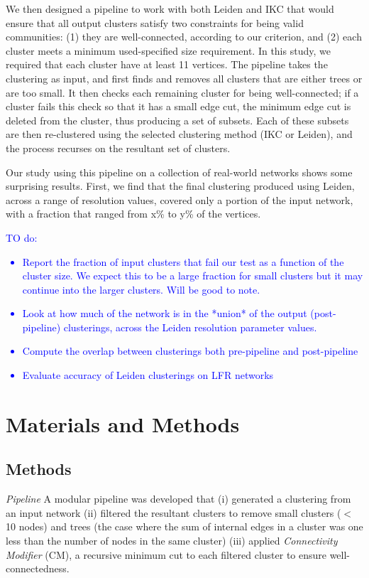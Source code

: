 \documentclass[12pt, oneside]{article}   	%
\begin{document}
We then designed a pipeline to work with both Leiden and IKC that would ensure that all output clusters satisfy two constraints for being valid communities: (1) they are well-connected, according to our criterion, and (2) each cluster meets a minimum used-specified size requirement. In this study, we required that each cluster have at least 11 vertices. The pipeline takes the clustering as input, and first finds and removes all clusters that are either trees or are too small.  It then checks each remaining cluster for being well-connected; if a cluster fails this check so that it has a small edge cut, the minimum edge cut is deleted from the cluster, thus producing a set of subsets.  Each of these subsets are then re-clustered using the selected clustering
method (IKC or Leiden), and the process recurses on the resultant set of clusters.

Our study using this pipeline on a collection of real-world networks shows some surprising results.
First, we find that the final clustering produced using Leiden, across a range of resolution values, 
covered only a portion of the input network, with a  fraction that ranged from x\% to y\% of the vertices.

\textcolor{blue}{TO do:
\begin{itemize}
\item Report the fraction of input clusters that fail our test as a function of the cluster size.
We expect this to be a large fraction for small clusters but it may continue into the larger clusters.
Will be good to note.
\item Look at how much of the network is in the *union* of the output (post-pipeline) clusterings, across the Leiden resolution parameter values.
\item Compute the overlap between clusterings both pre-pipeline and post-pipeline
\item  Evaluate accuracy of Leiden clusterings on LFR networks 
\end{itemize}
}

\section{Materials and Methods}

\subsection{Methods} 
\emph{Pipeline} A modular pipeline was developed that (i) generated a clustering from an input network (ii) filtered the resultant clusters to remove small clusters ($<$ 10 nodes) and trees (the case where the sum of internal edges in a cluster was one less than the number of nodes in the same cluster) (iii) applied \emph{Connectivity Modifier} (CM), a recursive minimum cut to each filtered cluster to ensure well-connectedness.
\end{document}

